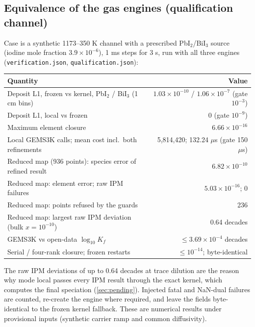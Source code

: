 \documentclass[11pt,a4paper]{article}
\newcommand{\slug}[1]{\path{#1}}
\begin{document}
\begin{table}[tb]
\centering
\caption{Iodine profile changes $E_{L1}$ (\%) between successive mesh
levels at 2 ms, relative to the finer level, and for halving the time
step (18,432 cells, upwind). Steel cases are Q2 (Liu et al.\ steel
column); the shifted-BiI case uses 1\% metal saturation. A dash marks a
combination not run. (Generated table of the methods manuscript.)}
\label{tab:numerical}
\small
\end{table}

\subsection{Equivalence of the gas engines (qualification channel)}
\label{sec:gemsequiv}

Case \slug{pbbi-gems-speciation} is a synthetic 1173--350 K channel with
a prescribed PbI$_2$/BiI$_3$ source (iodine mole fraction
$3.9\times10^{-6}$), 1 ms steps for 3 s, run with all three engines
(\texttt{verification.json}, \texttt{qualification.json}):
\begin{center}
\small
\begin{tabular}{lr}
\toprule
Quantity & Value\\
\midrule
Deposit L1, frozen vs kernel, PbI$_2$ / BiI$_3$ (1 cm bins) &
  $1.03\times10^{-10}$ / $1.06\times10^{-7}$ (gate $10^{-3}$)\\
Deposit L1, local vs frozen & 0 (gate $10^{-9}$)\\
Maximum element closure & $6.66\times10^{-16}$\\
Local GEMS3K calls; mean cost incl.\ both refinements & 5,814,420;
  132.24 $\mu$s (gate 150 $\mu$s)\\
Reduced map (936 points): species error of refined result &
  $6.82\times10^{-10}$\\
Reduced map: element error; raw IPM failures & $5.03\times10^{-16}$; 0\\
Reduced map: points refused by the guards & 236\\
Reduced map: largest raw IPM deviation (bulk $x=10^{-10}$) & 0.64 decades\\
GEMS3K vs open-data $\log_{10}K_f$ & $\le3.69\times10^{-4}$ decades\\
Serial / four-rank closure; frozen restarts & $\le10^{-14}$; byte-identical\\
\bottomrule
\end{tabular}
\end{center}
The raw IPM deviations of up to 0.64 decades at trace dilution are the
reason why mode local passes every IPM result through the exact kernel,
which computes the final speciation (\cref{sec:pending}). Injected fatal and NaN-dual failures are counted, re-create the
engine where required, and leave the fields byte-identical to the frozen
kernel fallback. These are numerical results under provisional inputs
(synthetic carrier ramp and common diffusivity).
\end{document}
